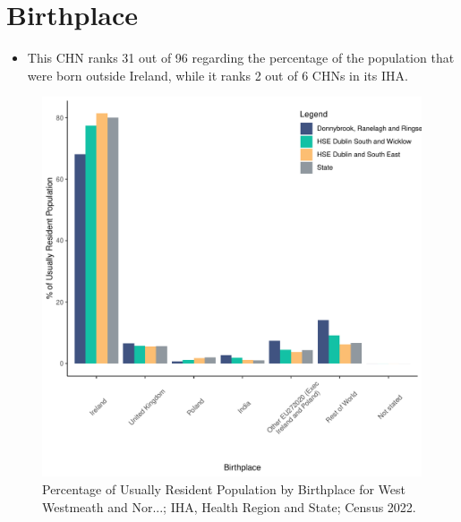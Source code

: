 \documentclass{article}
\begin{document}
\section{Birthplace}\label{sect:Birth}
\begin{itemize}
\item This CHN ranks  31 out of 96 regarding the percentage of the population that were born outside Ireland, while it ranks  2 out of 6 CHNs in its IHA.
\end{itemize}
\begin{figure}[H]
	\centering
	\includegraphics[width = 130mm]{../figures/BirthED.pdf}
	\caption{Percentage of Usually Resident Population by Birthplace for West Westmeath and Nor...; IHA, Health Region and State; Census 2022.}
	\label{fig:vbnv}
	\end{figure}
	
\end{document}
